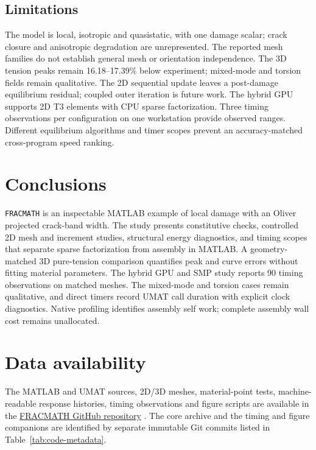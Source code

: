 \documentclass[preprint,11pt,a4paper]{elsarticle}
\begin{document}
\subsection{Limitations}

The model is local, isotropic and quasistatic, with one damage scalar;
crack closure and anisotropic degradation are unrepresented. The reported
mesh families do not establish general mesh or orientation independence.
The 3D tension peaks remain 16.18--17.39\% below experiment; mixed-mode and
torsion fields remain qualitative. The 2D sequential update leaves a
post-damage equilibrium residual; coupled outer iteration is future work.
The hybrid GPU supports 2D T3 elements with CPU sparse factorization.
Three timing observations per configuration on one workstation provide
observed ranges. Different equilibrium algorithms and timer scopes prevent
an accuracy-matched cross-program speed ranking.

\section{Conclusions}

\texttt{FRACMATH} is an inspectable MATLAB example of local damage
with an Oliver projected crack-band width. The study presents constitutive checks, controlled 2D mesh and increment studies,
structural energy diagnostics, and timing scopes that separate sparse
factorization from assembly in MATLAB. A geometry-matched 3D pure-tension
comparison quantifies peak and curve errors without fitting material
parameters.
The hybrid GPU and SMP study reports 90 timing observations on matched meshes. The mixed-mode and torsion cases remain qualitative, and
direct timers record UMAT call duration with explicit clock diagnostics.
Native profiling identifies assembly self work; complete assembly wall
cost remains unallocated.

\section*{Data availability}

The MATLAB and UMAT sources, 2D/3D meshes, material-point tests,
machine-readable response histories, timing observations and figure scripts are
available in the \href{https://github.com/Jaykumar9033/FRACMATH/tree/main}{FRACMATH GitHub repository} \citep{fracmath}.
The core archive and the timing and figure companions are identified by separate immutable Git commits listed in Table~\ref{tab:code-metadata}.
\end{document}
